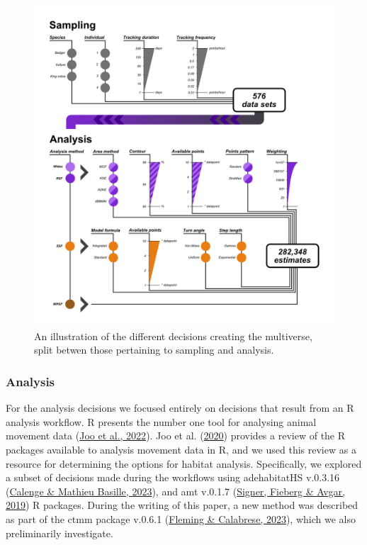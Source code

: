 \documentclass[10pt,a4paper]{article}
\begin{document}
\begin{figure}
\includegraphics[width=1\linewidth]{../ext_images/Decision Visualisation} \caption{An illustration of the different decisions creating the multiverse, split betwen those pertaining to sampling and analysis.}\label{fig:decisionTrees}
\end{figure}

\hypertarget{analysis}{%
\subsubsection{Analysis}\label{analysis}}

For the analysis decisions we focused entirely on decisions that result from an R analysis workflow.
R presents the number one tool for analysing animal movement data (\protect\hyperlink{ref-joo_recent_2022}{Joo et al., 2022}).
Joo et al. (\protect\hyperlink{ref-joo_navigating_2020}{2020}) provides a review of the R packages available to analysis movement data in R, and we used this review as a resource for determining the options for habitat analysis.
Specifically, we explored a subset of decisions made during the workflows using adehabitatHS v.0.3.16 (\protect\hyperlink{ref-adehabitatHS}{Calenge \& Mathieu Basille, 2023}), and amt v.0.1.7 (\protect\hyperlink{ref-amt}{Signer, Fieberg \& Avgar, 2019}) R packages.
During the writing of this paper, a new method was described as part of the ctmm package v.0.6.1 (\protect\hyperlink{ref-ctmm}{Fleming \& Calabrese, 2023}), which we also preliminarily investigate.
\end{document}
